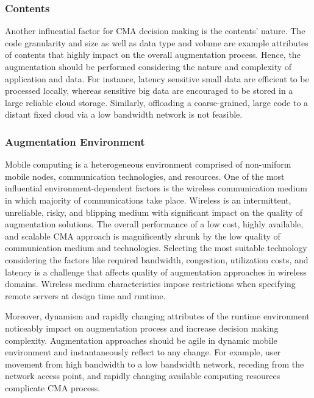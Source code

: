 \documentclass[publish]{IEEEtran}
\begin{document}
\subsubsection{Contents}
Another influential factor for CMA decision making is the contents' nature. The code granularity and size as well as data type and volume are example attributes of contents that highly impact on the overall augmentation process. Hence, the augmentation should be performed considering the nature and complexity of application and data. For instance, latency sensitive small data are efficient to be processed locally, whereas sensitive big data are encouraged to be stored in a large reliable cloud storage. Similarly, offloading a coarse-grained, large code to a distant fixed cloud via a low bandwidth network is not feasible. 

\subsubsection{Augmentation Environment}
Mobile computing is a heterogeneous environment comprised of non-uniform mobile nodes, communication technologies, and  resources. One of the most influential environment-dependent factors is the wireless communication medium in which majority of communications take place. Wireless is an intermittent, unreliable, risky, and blipping medium with significant impact on the quality of augmentation solutions. The overall performance of a low cost, highly available, and scalable CMA approach is magnificently shrunk by the low quality of communication medium and technologies. Selecting the most suitable technology considering the factors like required bandwidth, congestion, utilization costs, and latency \cite{Bellavista2011} is a challenge that affects quality of augmentation approaches in wireless domains. Wireless medium characteristics impose restrictions when specifying remote servers at design time and runtime. 

Moreover, dynamism and rapidly changing attributes of the runtime environment noticeably impact on augmentation process and increase decision making complexity. Augmentation approaches should be agile in dynamic mobile environment and instantaneously reflect to any change. For example, user movement from high bandwidth to a low bandwidth network, receding from the network access point, and rapidly changing available computing resources complicate CMA process.
\end{document}
